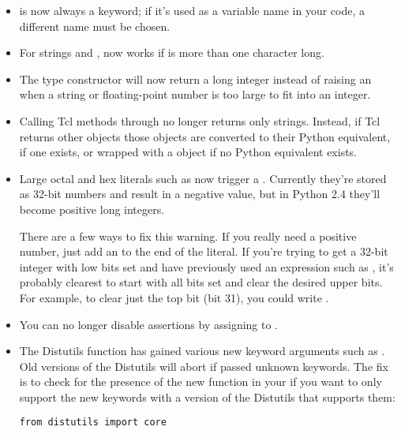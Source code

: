 \documentclass{howto}
\begin{document}
\begin{itemize}

\item {} is now always a keyword; if it's used as a
variable name in your code, a different name must be chosen.

\item For strings  and ,  now works
if  is more than one character long.

\item The  type constructor will now return a long
integer instead of raising an  when a string
or floating-point number is too large to fit into an integer.

\item Calling Tcl methods through  no longer 
returns only strings. Instead, if Tcl returns other objects those
objects are converted to their Python equivalent, if one exists, or
wrapped with a  object if no Python equivalent
exists.

\item Large octal and hex literals such as
 now trigger a . Currently
they're stored as 32-bit numbers and result in a negative value, but
in Python 2.4 they'll become positive long integers. 

There are a few ways to fix this warning.  If you really need a
positive number, just add an  to the end of the literal.  If
you're trying to get a 32-bit integer with low bits set and have
previously used an expression such as , it's probably
clearest to start with all bits set and clear the desired upper bits.
For example, to clear just the top bit (bit 31), you could write
.

\item You can no longer disable assertions by assigning to .

\item The Distutils  function has gained various new
keyword arguments such as .  Old versions of the
Distutils will abort if passed unknown keywords.  The fix is to check
for the presence of the new  function
in your  if you want to only support the new keywords
with a version of the Distutils that supports them:

\begin{verbatim}
from distutils import core


\end{verbatim}
\end{itemize}
\end{document}
